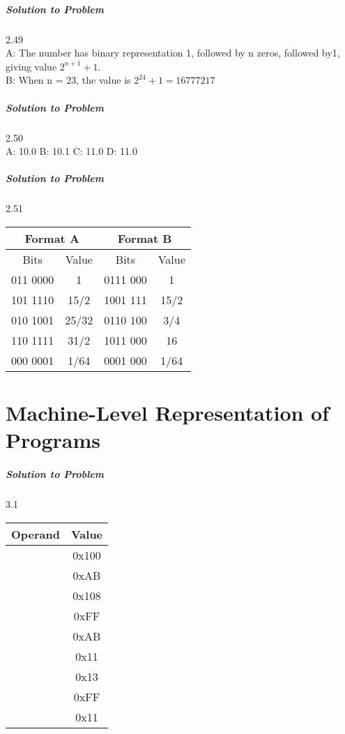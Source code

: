 \documentclass{report}
\begin{document}
\paragraph{Solution to Problem} 2.49 \\
A: The number has binary representation 1, followed by n zeros, followed by1, giving value $2^{n+1} + 1$. \\
B: When n = 23, the value is $2^{24} + 1 = 16777217$

\paragraph{Solution to Problem} 2.50 \\
A: 10.0
B: 10.1
C: 11.0
D: 11.0

\paragraph{Solution to Problem} 2.51 \\
\begin{center}
\begin{tabular}{ |c|c|c|c| } 
\hline
\multicolumn{2}{|c|}{Format A}  &   \multicolumn{2}{|c|}{Format B}  \\  
\hline
Bits & Value & Bits & Value  \\ 
\hline
011 0000 & 1 & 0111 000 & 1 \\
101 1110 & 15/2 & 1001 111 & 15/2 \\
010 1001 & 25/32 & 0110 100 & 3/4 \\
110 1111 & 31/2 & 1011 000 & 16 \\
000 0001 & 1/64 & 0001 000 & 1/64 \\
\hline
\end{tabular}
\end{center}


\chapter{Machine-Level Representation of Programs}
\paragraph{Solution to Problem } 3.1 \\
\begin{center}
\begin{tabular}{ |c|c| } 
\hline
Operand & Value \\
\hline
 & 0x100 \\
 & 0xAB \\
 & 0x108 \\
 & 0xFF \\
 & 0xAB \\
 & 0x11 \\
 & 0x13 \\
 & 0xFF \\
 & 0x11 \\
\hline
\end{tabular}
\end{center}
\end{document}
